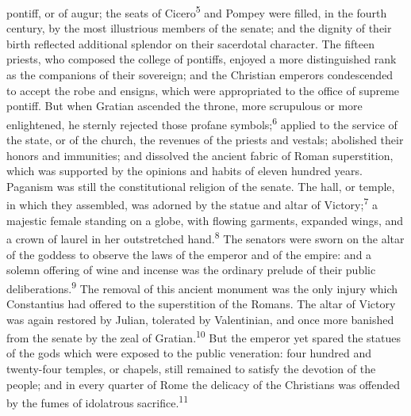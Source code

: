 pontiff, or of augur; the seats of Cicero\textsuperscript{5} and Pompey were
filled, in the fourth century, by the most illustrious members of
the senate; and the dignity of their birth reflected additional
splendor on their sacerdotal character. The fifteen priests, who
composed the college of pontiffs, enjoyed a more distinguished
rank as the companions of their sovereign; and the Christian
emperors condescended to accept the robe and ensigns, which were
appropriated to the office of supreme pontiff. But when Gratian
ascended the throne, more scrupulous or more enlightened, he
sternly rejected those profane symbols;\textsuperscript{6} applied to the service
of the state, or of the church, the revenues of the priests and
vestals; abolished their honors and immunities; and dissolved the
ancient fabric of Roman superstition, which was supported by the
opinions and habits of eleven hundred years. Paganism was still
the constitutional religion of the senate. The hall, or temple,
in which they assembled, was adorned by the statue and altar of
Victory;\textsuperscript{7} a majestic female standing on a globe, with flowing
garments, expanded wings, and a crown of laurel in her
outstretched hand.\textsuperscript{8} The senators were sworn on the altar of the
goddess to observe the laws of the emperor and of the empire: and
a solemn offering of wine and incense was the ordinary prelude of
their public deliberations.\textsuperscript{9} The removal of this ancient
monument was the only injury which Constantius had offered to the
superstition of the Romans. The altar of Victory was again
restored by Julian, tolerated by Valentinian, and once more
banished from the senate by the zeal of Gratian.\textsuperscript{10} But the
emperor yet spared the statues of the gods which were exposed to
the public veneration: four hundred and twenty-four temples, or
chapels, still remained to satisfy the devotion of the people;
and in every quarter of Rome the delicacy of the Christians was
offended by the fumes of idolatrous sacrifice.\textsuperscript{11}



